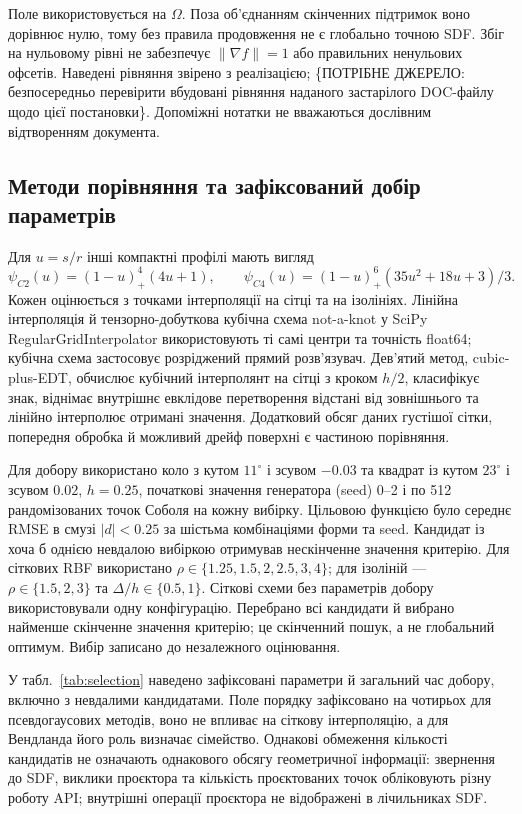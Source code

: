 \documentclass[12pt]{article}
\newcommand{\draft}[1]{\{#1\}}
\begin{document}
Поле використовується на $\Omega$. Поза об'єднанням скінченних підтримок воно дорівнює нулю, тому без правила продовження не є глобально точною SDF. Збіг на нульовому рівні не забезпечує $\|\nabla f\|=1$ або правильних ненульових офсетів. Наведені рівняння звірено з реалізацією; \draft{ПОТРІБНЕ ДЖЕРЕЛО: безпосередньо перевірити вбудовані рівняння наданого застарілого DOC-файлу щодо цієї постановки}. Допоміжні нотатки не вважаються дослівним відтворенням документа.

\subsection{Методи порівняння та зафіксований добір параметрів}
Для $u=s/r$ інші компактні профілі мають вигляд
\begin{equation}
    \psi_{C2}(u)=(1-u)_+^4(4u+1),\qquad
    \psi_{C4}(u)=(1-u)_+^6(35u^2+18u+3)/3.
\end{equation}
Кожен оцінюється з точками інтерполяції на сітці та на ізолініях. Лінійна інтерполяція й тензорно-добуткова кубічна схема not-a-knot у SciPy \textenglish{RegularGrid\-Interpolator} використовують ті самі центри та точність float64; кубічна схема застосовує розріджений прямий розв'язувач. Дев'ятий метод, cubic-plus-EDT, обчислює кубічний інтерполянт на сітці з кроком $h/2$, класифікує знак, віднімає внутрішнє евклідове перетворення відстані від зовнішнього та лінійно інтерполює отримані значення. Додатковий обсяг даних густішої сітки, попередня обробка й можливий дрейф поверхні є частиною порівняння.

Для добору використано коло з кутом $11^\circ$ і зсувом $-0.03$ та квадрат із кутом $23^\circ$ і зсувом $0.02$, $h=0.25$, початкові значення генератора (seed) 0--2 і по 512 рандомізованих точок Соболя на кожну вибірку. Цільовою функцією було середнє RMSE в смузі $|d|<0.25$ за шістьма комбінаціями форми та seed. Кандидат із хоча б однією невдалою вибіркою отримував нескінченне значення критерію. Для сіткових RBF використано $\rho\in\{1.25,1.5,2,2.5,3,4\}$; для ізоліній — $\rho\in\{1.5,2,3\}$ та $\Delta/h\in\{0.5,1\}$. Сіткові схеми без параметрів добору використовували одну конфігурацію. Перебрано всі кандидати й вибрано найменше скінченне значення критерію; це скінченний пошук, а не глобальний оптимум. Вибір записано до незалежного оцінювання.

У табл.~\ref{tab:selection} наведено зафіксовані параметри й загальний час добору, включно з невдалими кандидатами. Поле порядку зафіксовано на чотирьох для псевдогаусових методів, воно не впливає на сіткову інтерполяцію, а для Вендланда його роль визначає сімейство. Однакові обмеження кількості кандидатів не означають однакового обсягу геометричної інформації: звернення до SDF, виклики проєктора та кількість проєктованих точок обліковують різну роботу API; внутрішні операції проєктора не відображені в лічильниках SDF.
\begin{table}[htbp]\centering\small\caption{Зафіксований добір і збережені витрати часу. Крок рівнів не застосовується до інтерполяції у вузлах сітки, а радіус — до сіткових інтерполяційних схем.}\label{tab:selection}\end{table}
\end{document}
